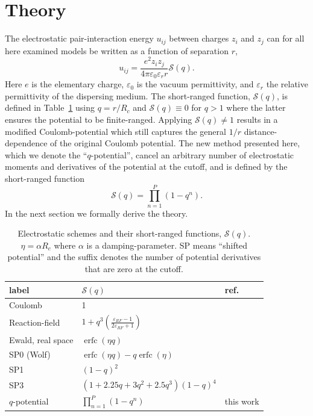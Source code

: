 \documentclass[
journal=jctcce,
manuscript=letter]{achemso}
\DeclareMathOperator{\erfc}{erfc}
\begin{document}
\section{Theory}

The electrostatic pair-interaction energy $u_{ij}$ between charges $z_i$ and $z_j$ can for all here examined models be written as a function of separation $r$, 
\begin{equation}
\label{eq:coulomb_splitting}
    u_{ij} = \frac{e^2z_i z_j}{4\pi\varepsilon_0\varepsilon_r r}
    \mathcal{S}(q).%
\end{equation}
Here $e$ is the elementary charge, $\varepsilon_0$ is the vacuum permittivity, and $\varepsilon_r$ the relative permittivity of the dispersing medium. The short-ranged function, $\mathcal{S}(q)$, is defined in Table~\ref{tbl:split} using $q=r/R_c$ and $\mathcal{S}(q)\equiv 0$ for $q>1$ where the latter ensures the potential to be finite-ranged. Applying $\mathcal{S}(q)\ne 1$ results in a modified Coulomb-potential which still captures the general $1/r$ distance-dependence of the original Coulomb potential.
The new method presented here, which we denote the ``$q$-potential'', cancel an arbitrary number of electrostatic moments and derivatives of the potential at the cutoff, and is defined by the short-ranged function
\begin{equation}\label{eq:qpot}
    \mathcal{S}(q) = \prod_{n=1}^{P}(1-q^n).
\end{equation}
In the next section we formally derive the theory.

\begin{table}[ht]
    \centering
    \begin{tabular}{lll}\hline
     label         & $\mathcal{S}(q)$        & ref.\\\hline
     Coulomb & 1 & \\
     Reaction-field & $1+q^3\left(\frac{\varepsilon_{RF}-1}{2\varepsilon_{RF}+1}\right)$ & \cite{Barker1973}\\
     Ewald, real space & $ \erfc{(\eta q)} $ & \cite{ewald1921berechnung}\\
     SP0 (Wolf)          & $ \erfc{(\eta q)}-q\erfc{(\eta)} $ & \cite{wolf1999exact}\\
     SP1        & $(1-q)^2$ & \cite{Fennell2006} \\
     SP3   & $(1 + 2.25q + 3q^2+2.5q^3)(1-q)^4$ & \cite{fanourgakis2009fast}\\\hline
     $q$-potential   & $\prod_{n=1}^{P}(1-q^n)$ & this work\\\hline
    \end{tabular}
    \caption{Electrostatic schemes and their short-ranged functions, $\mathcal{S}(q)$.
    $\eta = \alpha R_c$ where $\alpha$ is a damping-parameter. SP means ``shifted potential'' and the suffix denotes the number of potential derivatives that are zero at the cutoff.}
    \label{tbl:split}
\end{table}
\end{document}
